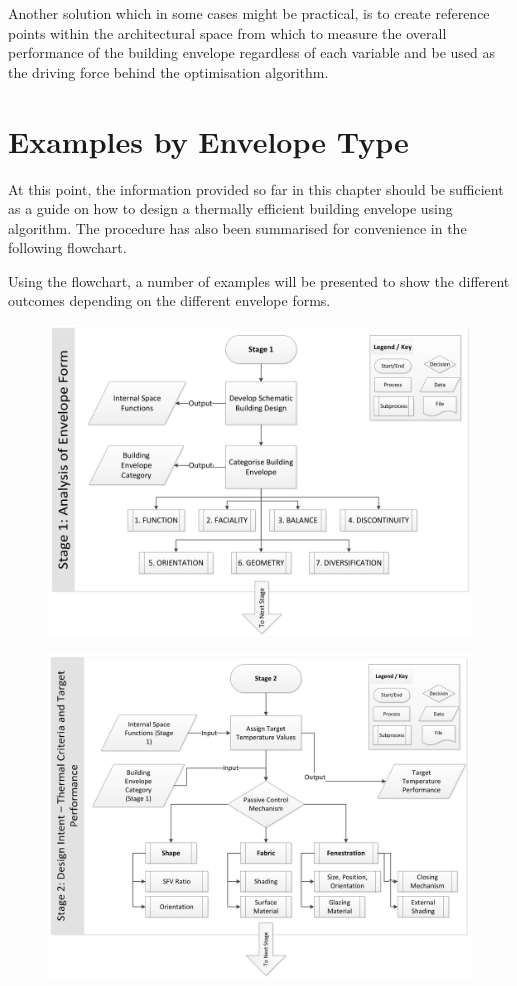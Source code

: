 Another solution which in some cases might be practical, is to create reference points within the architectural space from which to measure the overall performance of the building envelope regardless of each variable and be used as the driving force behind the optimisation algorithm.


\clearpage
\section{Examples by Envelope Type}

At this point, the information provided so far in this chapter should be sufficient as a guide on how to design a thermally efficient building envelope using algorithm. The procedure has also been summarised for convenience in the following flowchart.

Using the flowchart, a number of examples will be presented to show the different outcomes depending on the different envelope forms.

\clearpage
\begin{figure}
	\centering
	\includegraphics[width=\textheight]{./Images/9a-Flowchart}
\end{figure}

\begin{figure}
	\centering
	\includegraphics[width=\textheight]{./Images/9b-Flowchart}
\end{figure}

